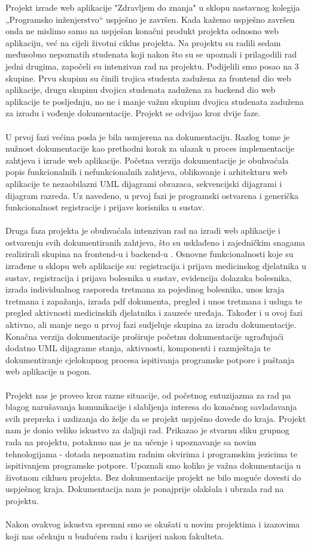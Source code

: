 		Projekt izrade web aplikacije "Zdravljem do znanja" u sklopu nastavnog kolegija „Programsko inženjerstvo“ uspješno je završen. Kada kažemo uspješno završen onda ne mislimo samo na uspješan konačni produkt projekta odnosno web aplikaciju, već na cijeli životni ciklus projekta.  Na projektu su radili sedam međusobno nepoznatih studenata koji nakon što su se upoznali i prilagodili rad jedni drugima, započeli su intenzivan rad na projektu. Podijelili smo posao na 3 skupine. Prvu skupinu su činili trojica studenta zadužena za frontend dio web aplikacije, drugu skupinu dvojica studenata zadužena za backend dio web aplikacije te posljednju, no ne i manje važnu skupinu dvojica studenata zadužena za izradu i vođenje dokumentacije.
		Projekt se odvijao kroz dvije faze. \\ \\
		 U prvoj fazi većina posla je bila usmjerena na dokumentaciju. Razlog tome je nužnost dokumentacije kao prethodni korak za ulazak u proces implementacije zahtjeva i izrade web aplikacije. Početna verzija dokumentacije je obuhvaćala popis funkcionalnih i nefunkcionalnih zahtjeva, oblikovanje i arhitekturu web aplikacije te nezaobilazni UML dijagrami obrazaca, sekvencijski dijagrami i dijagram razreda. Uz navedeno, u prvoj fazi je programski ostvarena i generička funkcionalnost registracije i prijave korisnika u sustav. \\ \\
		Druga faza projekta je obuhvaćala intenzivan rad na izradi web aplikacije i ostvarenju svih dokumentiranih zahtjeva, što su usklađeno i zajedničkim snagama realizirali skupina na frontend-u i backend-u . Osnovne funkcionalnosti koje su izrađene u sklopu web aplikacije su: registracija i prijava medicinskog djelatnika u sustav, registracija i prijava bolesnika u sustav, evidencija dolazaka bolesnika, izrada individualnog rasporeda tretmana za pojedinog bolesnika, unos kraja tretmana i zapažanja, izrada pdf dokumenta, pregled i unos tretmana i usluga te pregled aktivnosti medicinskih djelatnika i zauzeće uređaja. Također i u ovoj fazi aktivno, ali manje nego u prvoj fazi sudjeluje skupina za izradu dokumentacije. Konačna verzija dokumentacije proširuje  početnu dokumentacije ugrađujući dodatno UML dijagrame stanja, aktivnosti, komponenti i razmještaja te dokumentiranje cjelokupnog procesa ispitivanja programske potpore i puštanja web aplikacije u pogon. \\ \\
		Projekt nas je proveo kroz razne situacije, od početnog entuzijazma za rad pa blagog narušavanja komunikacije i slabljenja interesa do konačnog savladavanja svih prepreka i uzdizanja do želje da se projekt uspješno dovede do kraja. Projekt nam je donio veliko iskustvo za daljnji rad. Prikazao je stvarnu sliku grupnog rada na projektu, potaknuo nas je na učenje i upoznavanje sa novim tehnologijama - dotada nepoznatim radnim okvirima i programskim jezicima te ispitivanjem programske potpore. Upoznali smo koliko je važna dokumentacija u životnom ciklusu projekta. Bez dokumentacije projekt ne bilo moguće dovesti do uspješnog kraja. Dokumentacija nam je ponajprije olakšala i ubrzala rad na projektu. \\ \\ 
		Nakon ovakvog iskustva spremni smo se okušati u novim projektima i izazovima koji nas očekuju u budućem radu i karijeri nakon fakulteta.
		
		
		\eject 
